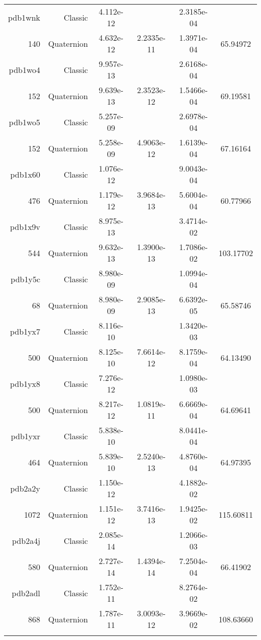 \begin{xltabular}{\textwidth}{r|rS[table-format=1.3e+2]S[table-format=1.4e+2]S[table-format=1.4e+2]S[table-format=-1.5]}
pdb1wnk & Classic & 4.112e-12 &  & 2.3185e-04 & \\
140 & Quaternion & 4.632e-12 & 2.2335e-11 & 1.3971e-04 & 65.94972\\  \addlinespace
pdb1wo4 & Classic & 9.957e-13 &  & 2.6168e-04 & \\
152 & Quaternion & 9.639e-13 & 2.3523e-12 & 1.5466e-04 & 69.19581\\  \addlinespace
pdb1wo5 & Classic & 5.257e-09 &  & 2.6978e-04 & \\
152 & Quaternion & 5.258e-09 & 4.9063e-12 & 1.6139e-04 & 67.16164\\  \addlinespace
pdb1x60 & Classic & 1.076e-12 &  & 9.0043e-04 & \\
476 & Quaternion & 1.179e-12 & 3.9684e-13 & 5.6004e-04 & 60.77966\\  \addlinespace
pdb1x9v & Classic & 8.975e-13 &  & 3.4714e-02 & \\
544 & Quaternion & 9.632e-13 & 1.3900e-13 & 1.7086e-02 & 103.17702\\  \addlinespace
pdb1y5c & Classic & 8.980e-09 &  & 1.0994e-04 & \\
68 & Quaternion & 8.980e-09 & 2.9085e-13 & 6.6392e-05 & 65.58746\\  \addlinespace
pdb1yx7 & Classic & 8.116e-10 &  & 1.3420e-03 & \\
500 & Quaternion & 8.125e-10 & 7.6614e-12 & 8.1759e-04 & 64.13490\\  \addlinespace
pdb1yx8 & Classic & 7.276e-12 &  & 1.0980e-03 & \\
500 & Quaternion & 8.217e-12 & 1.0819e-11 & 6.6669e-04 & 64.69641\\  \addlinespace
pdb1yxr & Classic & 5.838e-10 &  & 8.0441e-04 & \\
464 & Quaternion & 5.839e-10 & 2.5240e-13 & 4.8760e-04 & 64.97395\\  \addlinespace
pdb2a2y & Classic & 1.150e-12 &  & 4.1882e-02 & \\
1072 & Quaternion & 1.151e-12 & 3.7416e-13 & 1.9425e-02 & 115.60811\\  \addlinespace
pdb2a4j & Classic & 2.085e-14 &  & 1.2066e-03 & \\
580 & Quaternion & 2.727e-14 & 1.4394e-14 & 7.2504e-04 & 66.41902\\  \addlinespace
pdb2adl & Classic & 1.752e-11 &  & 8.2764e-02 & \\
868 & Quaternion & 1.787e-11 & 3.0093e-12 & 3.9669e-02 & 108.63660\\  \addlinespace

\end{xltabular}
